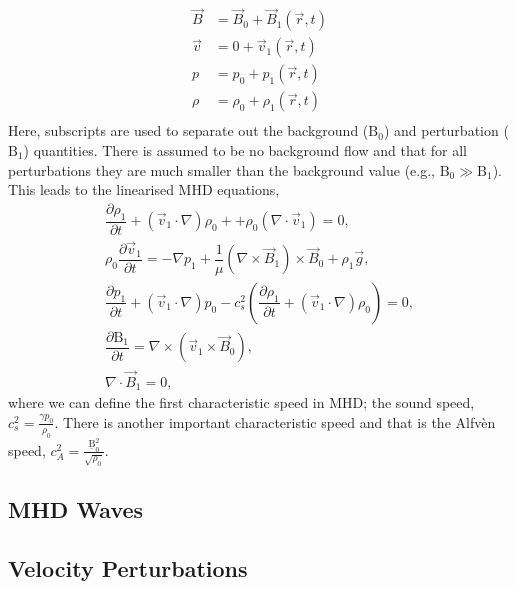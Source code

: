 \begin{align*}                                                         
    \vec{B} &= \vec{B}_0 + \vec{B}_1(\vec{r},t)\\               
    \vec{v} &= 0 + \vec{v}_1(\vec{r},t)\\               
    p &= p_0 + {p_1}(\vec{r},t)\\               
    \rho &= \rho_0 + {\rho_1}(\vec{r},t)\\              
\end{align*}
Here, subscripts are used to separate out the background ($\mathrm{B}_0$) and perturbation ($\mathrm{B}_1$) quantities.
There is assumed to be no background flow and that for all perturbations they are much smaller than the background value (e.g., $\mathrm{B}_0 \gg \mathrm{B}_1$).      
This leads to the linearised MHD equations,
\begin{align}                                                         
    \dfrac{\partial \rho_1 }{\partial t} + (\vec{v}_1 \cdot \nabla)\rho_0 + + \rho_0 (\nabla \cdot \vec{v}_1) =       
    0,
    \tag{Mass Conservation}\\
    \rho_0 \dfrac{\partial \vec{v}_1}{\partial t} =
    -\nabla p_1 + \dfrac{1}{\mu}(\nabla \times \vec{B}_1) \times \vec{B}_0 + \rho_1 \vec{g},
    \tag{Equation of Motion}\\
    \dfrac{\partial p_1}{\partial t} + (\vec{v}_1 \cdot \nabla)p_0 - c_s^2 \left( \dfrac{\partial \rho_1}{\partial t} + (\vec{v}_1 \cdot \nabla)\rho_0 \right) = 0,
    \tag{Energy Equation}\\
    \dfrac{\partial \mathrm{B}_1}{\partial t} = \nabla \times (\vec{v}_1 \times \vec{B}_0),
    \tag{Induction Equation}\\
    \nabla \cdot \vec{B}_1 = 0,
    \tag{Solenoid Equation}               
\end{align}
where we can define the first characteristic speed in MHD; the sound speed, $c_s^2 = \frac{\gamma p_0}{\rho_0}$.
There is another important characteristic speed and that is the Alfv\`{e}n speed, $c_A^2 = \frac{\mathrm{\underline{B}}_0^2}{\sqrt{\rho_0}}$.


\subsection{MHD Waves}\label{sec:MHDwaves}

\subsection{Velocity Perturbations}\label{sec:Vpert}

